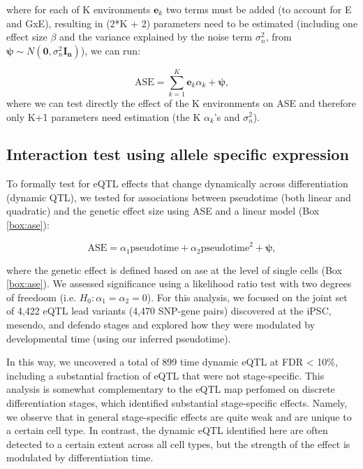 \begin{Comment}
where for each of K environments $\mathbf{e}_k$ two terms must be added (to account for E and GxE), resulting in (2*K + 2) parameters need to be estimated (including one effect size $\beta$ and the variance explained by the noise term $\sigma_n^2$, from $\boldsymbol{\psi} \sim N(\mathbf{0}, \sigma_n^2\mathbf{I_n})$), we can run:

\begin{equation*}
    \mathrm{ASE} = \sum_{k=1}^{K} \mathbf{e}_k\alpha_k + \boldsymbol{\psi}, 
\end{equation*}
where we can test directly the effect of the K environments on ASE and therefore only K+1 parameters need estimation (the K $\alpha_k$'s and $\sigma_n^2$).

\end{Comment}



\subsection{Interaction test using allele specific expression}

To formally test for eQTL effects that change dynamically across differentiation (dynamic QTL), we tested for associations between pseudotime (both linear and quadratic) and the genetic effect size using ASE and a linear model (Box \ref{box:ase}):

\begin{equation}
    \mathrm{ASE} = \alpha_1 \mathrm{pseudotime} + \alpha_2 \mathrm{pseudotime}^2 + \boldsymbol{\psi},
\end{equation}

where the genetic effect is defined based on \gls{ase} at the level of single cells (Box \ref{box:ase}).
We assessed significance using a likelihood ratio test with two degrees of freedoom (i.e. $H_0: \alpha_1 = \alpha_2 = 0$). 
For this analysis, we focused on the joint set of 4,422 eQTL lead variants (4,470 SNP-gene pairs) discovered at the iPSC, mesendo, and defendo stages and explored how they were modulated by developmental time (using our inferred pseudotime).

In this way, we uncovered a total of 899 time dynamic eQTL at FDR < 10\%, including a substantial fraction of eQTL that were not stage-specific.
This analysis is somewhat complementary to the eQTL map perfomed on discrete differentiation stages, which identified substantial stage-specific effects.
Namely, we observe that in general stage-specific effects are quite weak and are unique to a certain cell type.
In contrast, the dynamic eQTL identified here are often detected to a certain extent across all cell types, but the strength of the effect is modulated by differentiation time.\\

